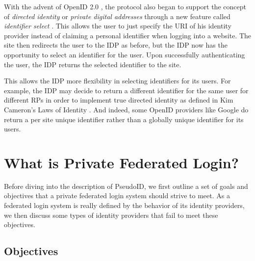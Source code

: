 \documentclass{llncs}
\begin{document}

With the advent of OpenID 2.0 \cite{OID2}, the protocol also began to support
the concept of \emph{directed identity} \cite{Cam06} or \emph{private digital
addresses} through a new feature called \emph{identifier select} \cite{RR06}.
This allows the user to just specify the URI of his identity provider instead
of claiming a personal identifier when logging into a website. The site then
redirects the user to the IDP as before, but the IDP now has the opportunity to
select an identifier for the user. Upon successfully authenticating the user,
the IDP returns the selected identifier to the site.

This allows the IDP more flexibility in selecting identifiers for its users. For
example, the IDP may decide to return a different identifier for the same user
for different RPs in order to implement true directed identity as defined in Kim
Cameron's Laws of Identity \cite{Cam06}. And indeed, some OpenID providers like
Google do return a per site unique identifier rather than a globally unique
identifier for its users.

\section{What is Private Federated Login?}

Before diving into the description of PseudoID, we first outline a set of goals
and objectives that a private federated login system should strive to meet. As a
federated login system is really defined by the behavior of its identity
providers, we then discuss some types of identity providers that fail to meet
these objectives.

\subsection{Objectives}

\end{document}
